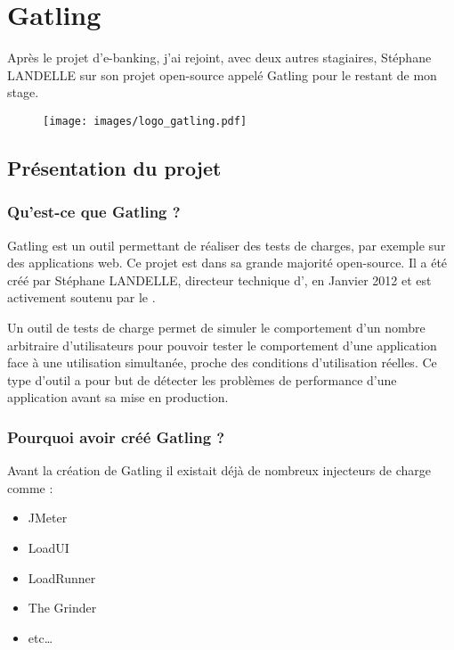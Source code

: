\section{Gatling}

Après le projet d'e-banking, j'ai rejoint, avec deux autres stagiaires, Stéphane LANDELLE sur son projet open-source appelé Gatling \cite{gatling} pour le restant de mon stage.

\begin{figure}[H]
 \centering
 \texttt{[image: images/logo\_gatling.pdf]}
\end{figure}


\subsection{Présentation du projet}

\subsubsection*{Qu'est-ce que Gatling ?}

Gatling \cite{gatling} est un outil permettant de réaliser des tests de charges, par exemple sur des applications web. Ce projet est dans sa grande majorité open-source. Il a été créé par Stéphane LANDELLE, directeur technique d'\ebi{}, en Janvier 2012 et est activement soutenu par le \excilysGroup{}.

Un outil de tests de charge permet de simuler le comportement d'un nombre arbitraire d'utilisateurs pour pouvoir tester le comportement d'une application face à une utilisation simultanée, proche des conditions d'utilisation réelles. Ce type d'outil a pour but de détecter les problèmes de performance d'une application avant sa mise en production.

\subsubsection*{Pourquoi avoir créé Gatling ?}

Avant la création de Gatling il existait déjà de nombreux injecteurs de charge comme :

\begin{itemize}
	\item JMeter
	\item LoadUI
	\item LoadRunner
	\item The Grinder
	\item etc\ldots \\
\end{itemize}

